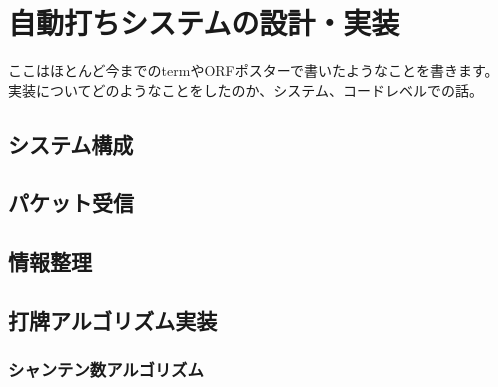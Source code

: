 \chapter{自動打ちシステムの設計・実装}
\label{chap:implementation}
ここはほとんど今までのtermやORFポスターで書いたようなことを書きます。
実装についてどのようなことをしたのか、システム、コードレベルでの話。
\section{システム構成}
\section{パケット受信}
\section{情報整理}
\section{打牌アルゴリズム実装}
\subsection{シャンテン数アルゴリズム}